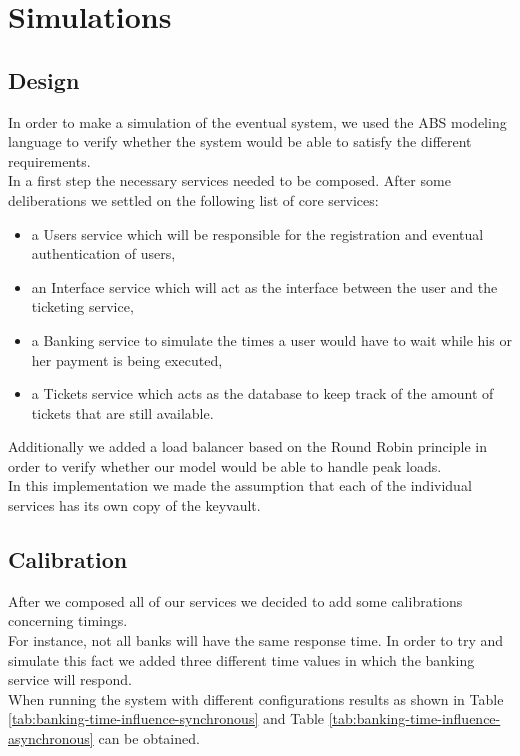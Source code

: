 \documentclass[10pt,a4paper,twocolumn]{article}
\begin{document}
\section{Simulations}
\subsection{Design}
In order to make a simulation of the eventual system, we used the ABS modeling language to verify whether the system would be able to satisfy the different requirements.\\
In a first step the necessary services needed to be composed. After some deliberations we settled on the following list of core services:
\begin{itemize}
	\item a Users service which will be responsible for the registration and eventual authentication of users,
	\item an Interface service which will act as the interface between the user and the ticketing service,
	\item a Banking service to simulate the times a user would have to wait while his or her payment is being executed,
	\item a Tickets service which acts as the database to keep track of the amount of tickets that are still available.
\end{itemize}
Additionally we added a load balancer based on the Round Robin principle in order to verify whether our model would be able to handle peak loads.\\
In this implementation we made the assumption that each of the individual services has its own copy of the keyvault.

\subsection{Calibration}
After we composed all of our services we decided to add some calibrations concerning timings.\\
For instance, not all banks will have the same response time. In order to try and simulate this fact we added three different time values in which the banking service will respond. \\
When running the system with different configurations results as shown in Table \ref{tab:banking-time-influence-synchronous} and Table \ref{tab:banking-time-influence-asynchronous} can be obtained.
\end{document}
